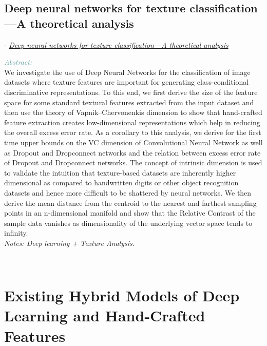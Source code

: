 \documentclass[]{article}
\newcommand{\paperentry}[4]{
            \hangindent=1cm
            \cite{#1} - \href{run:../References/#3}{\textcolor{Sepia}{\textit{#2}}}
            
            \noindent            
            \begin{minipage}[t]{0.1\linewidth}\hfill\end{minipage}
            \begin{minipage}[t]{0.8\linewidth}\textcolor{CadetBlue}{{\textit{Abstract:}}}\\#4\end{minipage}
            \vspace{.25cm}
          }
\begin{document}
 \subsection{Deep neural networks for texture classification—A theoretical analysis}			
 \paperentry{Basu2018deeptexture}
 {Deep neural networks for texture classification—A theoretical analysis}
 {Existing Approaches to Texture Analysis/Deep neural networks for texture classification—A theoretical analysis.pdf}
 {We investigate the use of Deep Neural Networks for the classification of image datasets where texture features are important for generating class-conditional discriminative representations. To this end, we first derive the size of the feature space for some standard textural features extracted from the input dataset and then use the theory of Vapnik–Chervonenkis dimension to show that hand-crafted feature extraction creates low-dimensional representations which help in reducing the overall excess error rate. As a corollary to this analysis, we derive for the first time upper bounds on the VC dimension of Convolutional Neural Network as well as Dropout and Dropconnect networks and the relation between excess error rate of Dropout and Dropconnect networks. The concept of intrinsic dimension is used to validate the intuition that texture-based datasets are inherently higher dimensional as compared to handwritten digits or other object recognition datasets and hence more difficult to be shattered by neural networks. We then derive the mean distance from the centroid to the nearest and farthest sampling points in an n-dimensional manifold and show that the Relative Contrast of the sample data vanishes as dimensionality of the underlying vector space tends to infinity.
 	\\\emph{Notes: Deep learning + Texture Analysis.}} \\ 
 
 
 \section{Existing Hybrid Models of Deep Learning and Hand-Crafted Features}
\end{document}
